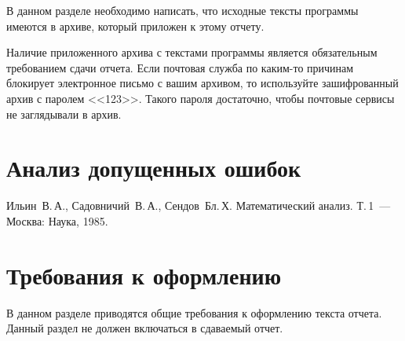 \documentclass[a4paper,12pt,titlepage,finall]{article}
\begin{document}
В данном разделе необходимо написать, что
исходные тексты программы имеются в архиве, который приложен к этому отчету.

Наличие приложенного архива с текстами программы является обязательным
требованием сдачи отчета. Если почтовая служба по каким-то причинам блокирует
электронное письмо с вашим архивом, то используйте зашифрованный архив с паролем <<123>>.
Такого пароля достаточно, чтобы почтовые сервисы не заглядывали в архив.

\newpage

\section{Анализ допущенных ошибок}

\newpage
\begin{raggedright}
\begin{thebibliography}{99}
 Ильин~В.\,А., Садовничий~В.\,А., Сендов~Бл.\,Х. Математический анализ. Т.\,1~---
    Москва: Наука, 1985.
\end{thebibliography}
\end{raggedright}

\newpage

\section*{Требования к оформлению}

В данном разделе приводятся общие требования к оформлению текста отчета.
Данный раздел не должен включаться в сдаваемый отчет.
\end{document}
